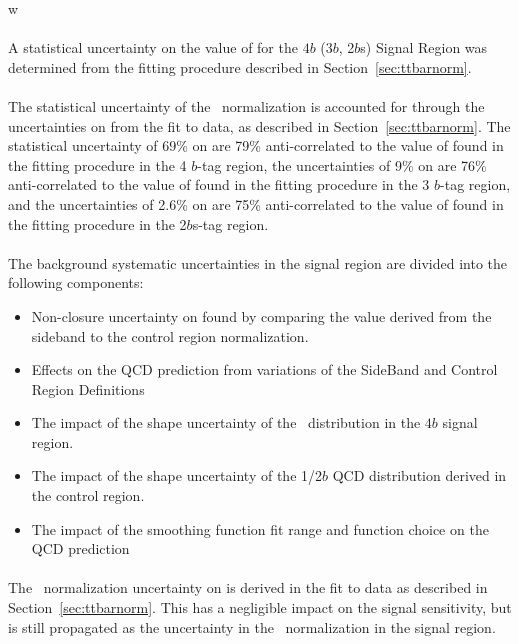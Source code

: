 w\paragraph{}
A statistical uncertainty on the value of \muqcd for the $4b$ ($3b$, 2$b$s) Signal Region was determined from the fitting procedure described in Section~\ref{sec:ttbarnorm}. 

\paragraph{}
The statistical uncertainty of the \ttbar\ normalization is accounted for through the uncertainties on \alphatt from the fit to data, as described in Section~\ref{sec:ttbarnorm}. The statistical uncertainty of 69\% on \alphatt are 79\% anti-correlated to the value of \muqcd found in the fitting procedure in the 4 $b$-tag region, the uncertainties of 9\% on \alphatt are 76\% anti-correlated to the value of \muqcd found in the fitting procedure in the 3 $b$-tag region, and the uncertainties of 2.6\% on \alphatt are 75\% anti-correlated to the value of \muqcd found in the fitting procedure in the 2$b$s-tag region.

\paragraph{}
The background systematic uncertainties in the signal region are divided into the following components:
\begin{itemize}
 \item Non-closure uncertainty on \muqcd found by comparing the value derived from the sideband to the control region normalization.
 \item Effects on the QCD prediction from variations of the SideBand and Control Region Definitions
 \item The impact of the shape uncertainty of the \ttbar\ distribution in the $4b$ signal region.
 \item The impact of the shape uncertainty of the 1/2$b$ QCD distribution derived in the control region.
 \item The impact of the smoothing function fit range and function choice on the QCD prediction
\end{itemize}

\paragraph{}
The \ttbar\ normalization uncertainty on \alphatt is derived in the fit to data as described in Section~\ref{sec:ttbarnorm}. This has a negligible impact on the signal sensitivity, but is still propagated as the uncertainty in the \ttbar\ normalization in the signal region.

